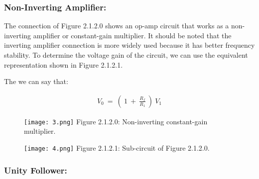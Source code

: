 \subsubsection{Non-Inverting Amplifier:}

The connection of Figure 2.1.2.0 shows an op-amp circuit that works as a non-inverting amplifier or constant-gain multiplier. It should be noted that the inverting amplifier connection is more widely used because it has better frequency stability. To determine the voltage gain of the circuit, we can use the equivalent representation shown in Figure 2.1.2.1. \hfill \break

{\bfseries\itshape\color{airforceblue}{Note:}} {\itshape{}} \hfill

The we can say that: \hfill \break

\begin{ceqn}
\begin{align*}
V_{0}\ =\ (\ 1\ +\ \frac{R_{f}}{R_{1}}\ )\ V_{1}
\end{align*}
\end{ceqn} \hfill

\begin{multicols}{2}
\begin{figure}[H]
\texttt{[image: 3.png]}
\centering \linebreak \linebreak Figure 2.1.2.0: Non-inverting constant-gain multiplier.
\end{figure}

\begin{figure}[H]
\texttt{[image: 4.png]}
\centering \linebreak \linebreak Figure 2.1.2.1: Sub-circuit of Figure 2.1.2.0.
\end{figure}
\end{multicols}

\subsubsection{Unity Follower:}


